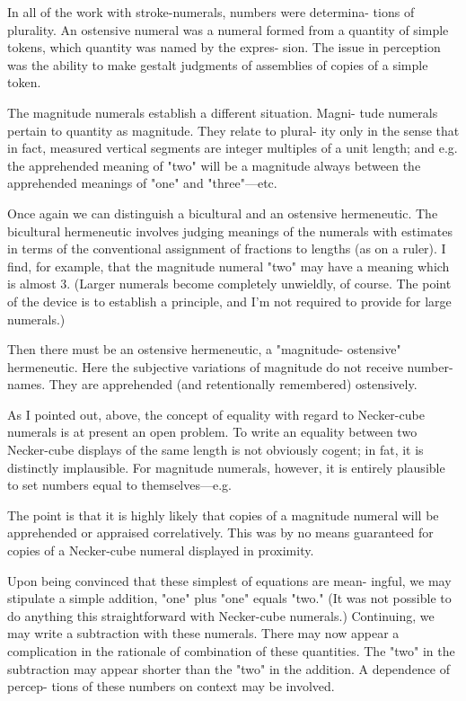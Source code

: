 In all of the work with stroke-numerals, numbers were determina- 
tions of plurality. An ostensive numeral was a numeral formed from a 
quantity of simple tokens, which quantity was named by the expres- 
sion. The issue in perception was the ability to make gestalt judgments 
of assemblies of copies of a simple token. 

The magnitude numerals establish a different situation. Magni- 
tude numerals pertain to quantity as magnitude. They relate to plural- 
ity only in the sense that in fact, measured vertical segments are integer 
multiples of a unit length; and e.g. the apprehended meaning of "two" 
will be a magnitude always between the apprehended meanings of 
"one" and "three"---etc. 

Once again we can distinguish a bicultural and an ostensive 
hermeneutic. The bicultural hermeneutic involves judging meanings of 
the numerals with estimates in terms of the conventional assignment of 
fractions to lengths (as on a ruler). I find, for example, that the 
magnitude numeral "two" may have a meaning which is almost 3. 
(Larger numerals become completely unwieldly, of course. The point of 
the device is to establish a principle, and I'm not required to provide for 
large numerals.) 

Then there must be an ostensive hermeneutic, a "magnitude- 
ostensive" hermeneutic. Here the subjective variations of magnitude do 
not receive number-names. They are apprehended (and retentionally 
remembered) ostensively. 

As I pointed out, above, the concept of equality with regard to 
Necker-cube numerals is at present an open problem. To write an 
equality between two Necker-cube displays of the same length is not 
obviously cogent; in fat, it is distinctly implausible. For magnitude 
numerals, however, it is entirely plausible to set numbers equal to 
themselves---e.g. 


The point is that it is highly likely that copies of a magnitude numeral 
will be apprehended or appraised correlatively. This was by no means 
guaranteed for copies of a Necker-cube numeral displayed in proximity. 


Upon being convinced that these simplest of equations are mean- 
ingful, we may stipulate a simple addition, "one" plus "one" equals 
"two." (It was not possible to do anything this straightforward with 
Necker-cube numerals.) Continuing, we may write a subtraction with 
these numerals. There may now appear a complication in the rationale 
of combination of these quantities. The "two" in the subtraction may 
appear shorter than the "two" in the addition. A dependence of percep- 
tions of these numbers on context may be involved. 


